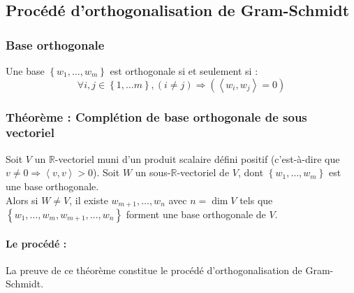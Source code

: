 \documentclass[a4paper,10pt]{article}
\newcommand{\grp}[1]{\left\langle #1 \right\rangle} %
\newcommand{\set}[1]{\left\lbrace #1 \right\rbrace } %
\newcommand{\so}{\Rightarrow} %
\newcommand{\RR}{\mathbb{R}} %
\begin{document}
  \subsection{Procédé d'orthogonalisation de Gram-Schmidt}
   \subsubsection{Base orthogonale}
    Une base $\set{w_1, \hdots, w_m}$ est orthogonale si et seulement si :
     $$\forall i,j \in \set{1, \hdots m}, (i\neq j) \so (\grp{w_i,w_j}=0)$$
   \subsubsection{Théorème : Complétion de base orthogonale de sous vectoriel}%
    Soit $V$ un $\RR$-vectoriel muni d'un produit scalaire défini positif (c'est-à-dire que $v\neq 0 \so \grp{v,v} > 0$). Soit $W$ un sous-$\RR$-vectoriel de $V$, dont $\set{w_1,\hdots, w_m}$ est une base orthogonale.\\
    Alors si $W\neq V$, il existe $w_{m+1},\hdots, w_n$ avec $n=\dim V$ tels que $\set{w_1,\hdots,w_m,w_{m+1},\hdots,w_n}$ forment une base orthogonale de $V$.

    \paragraph{Le procédé :} La preuve de ce théorème constitue le procédé d'orthogonalisation de Gram-Schmidt.
\end{document}
